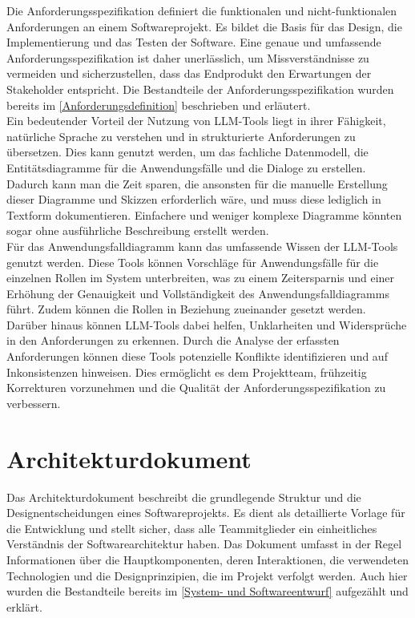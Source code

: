 Die Anforderungsspezifikation definiert die funktionalen und nicht-funktionalen Anforderungen an einem Softwareprojekt.
Es bildet die Basis für das Design, die Implementierung und das Testen der Software. Eine genaue und umfassende 
Anforderungsspezifikation ist daher unerlässlich, um Missverständnisse zu vermeiden und sicherzustellen, dass 
das Endprodukt den Erwartungen der Stakeholder entspricht. Die Bestandteile der Anforderungsspezifikation wurden 
bereits im \autoref{Anforderungsdefinition} beschrieben und erläutert.\\

Ein bedeutender Vorteil der Nutzung von LLM-Tools liegt in ihrer Fähigkeit, natürliche Sprache zu verstehen und in 
strukturierte Anforderungen zu übersetzen. Dies kann genutzt werden, um das fachliche Datenmodell, die 
Entitätsdiagramme für die Anwendungsfälle und die Dialoge zu erstellen. Dadurch kann man die Zeit sparen, die ansonsten 
für die manuelle Erstellung dieser Diagramme und Skizzen erforderlich wäre, und muss diese lediglich in Textform dokumentieren. 
Einfachere und weniger komplexe Diagramme könnten sogar ohne ausführliche Beschreibung erstellt werden.\\

Für das Anwendungsfalldiagramm kann das umfassende Wissen der LLM-Tools genutzt werden. Diese Tools können Vorschläge 
für Anwendungsfälle für die einzelnen Rollen im System unterbreiten, was zu einem Zeitersparnis und einer Erhöhung 
der Genauigkeit und Vollständigkeit des Anwendungsfalldiagramms führt. Zudem können die Rollen in Beziehung 
zueinander gesetzt werden.\\

Darüber hinaus können LLM-Tools dabei helfen, Unklarheiten und Widersprüche in den Anforderungen zu erkennen. 
Durch die Analyse der erfassten Anforderungen können diese Tools potenzielle Konflikte identifizieren und auf 
Inkonsistenzen hinweisen. Dies ermöglicht es dem Projektteam, frühzeitig Korrekturen vorzunehmen und die Qualität 
der Anforderungsspezifikation zu verbessern.

\section{Architekturdokument}  \label{Architekturdokument}

Das Architekturdokument beschreibt die grundlegende Struktur und die Designentscheidungen eines Softwareprojekts. Es 
dient als detaillierte Vorlage für die Entwicklung und stellt sicher, dass alle Teammitglieder ein einheitliches 
Verständnis der Softwarearchitektur haben. Das Dokument umfasst in der Regel Informationen über die Hauptkomponenten, 
deren Interaktionen, die verwendeten Technologien und die Designprinzipien, die im Projekt verfolgt werden. Auch hier 
wurden die Bestandteile bereits im \autoref{System- und Softwareentwurf} aufgezählt und erklärt.\\

